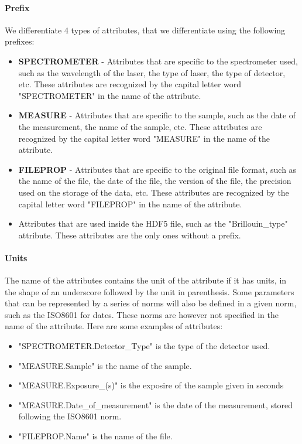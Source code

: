     \paragraph{Prefix}
    We differentiate 4 types of attributes, that we differentiate using the following prefixes:
    \begin{itemize}
        \item \textbf{SPECTROMETER} - Attributes that are specific to the spectrometer used, such as the wavelength of the laser, the type of laser, the type of detector, etc. These attributes are recognized by the capital letter word "SPECTROMETER" in the name of the attribute.
        \item \textbf{MEASURE} - Attributes that are specific to the sample, such as the date of the measurement, the name of the sample, etc. These attributes are recognized by the capital letter word "MEASURE" in the name of the attribute.
        \item \textbf{FILEPROP} - Attributes that are specific to the original file format, such as the name of the file, the date of the file, the version of the file, the precision used on the storage of the data, etc. These attributes are recognized by the capital letter word "FILEPROP" in the name of the attribute.
        \item Attributes that are used inside the HDF5 file, such as the "Brillouin\_type" attribute. These attributes are the only ones without a prefix.
    \end{itemize}

    \paragraph{Units}
    The name of the attributes contains the unit of the attribute if it has units, in the shape of an underscore followed by the unit in parenthesis. Some parameters that can be represented by a series of norms will also be defined in a given norm, such as the ISO8601 for dates. These norms are however not specified in the name of the attribute. Here are some examples of attributes:
    \begin{itemize}
        \item "SPECTROMETER.Detector\_Type" is the type of the detector used.
        \item "MEASURE.Sample" is the name of the sample.
        \item "MEASURE.Exposure\_(s)" is the exposire of the sample given in seconds
        \item "MEASURE.Date\_of\_measurement" is the date of the measurement, stored following the ISO8601 norm.
        \item "FILEPROP.Name" is the name of the file.
    \end{itemize}

